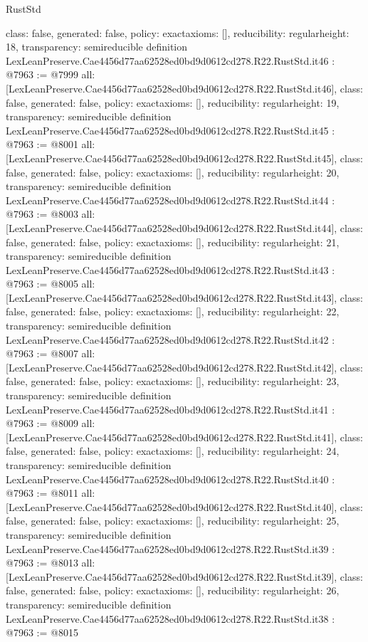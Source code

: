 \begin{lexlean}{RustStd}
\begin{coremodule}
{  class: false,
  generated: false,
  policy: exact{axioms: []},
  reducibility: regular{height: 18},
  transparency: semireducible
}
definition LexLeanPreserve.Cae4456d77aa62528ed0bd9d0612cd278.R22.RustStd.it46 : @7963 := @7999 {
  all: [LexLeanPreserve.Cae4456d77aa62528ed0bd9d0612cd278.R22.RustStd.it46],
  class: false,
  generated: false,
  policy: exact{axioms: []},
  reducibility: regular{height: 19},
  transparency: semireducible
}
definition LexLeanPreserve.Cae4456d77aa62528ed0bd9d0612cd278.R22.RustStd.it45 : @7963 := @8001 {
  all: [LexLeanPreserve.Cae4456d77aa62528ed0bd9d0612cd278.R22.RustStd.it45],
  class: false,
  generated: false,
  policy: exact{axioms: []},
  reducibility: regular{height: 20},
  transparency: semireducible
}
definition LexLeanPreserve.Cae4456d77aa62528ed0bd9d0612cd278.R22.RustStd.it44 : @7963 := @8003 {
  all: [LexLeanPreserve.Cae4456d77aa62528ed0bd9d0612cd278.R22.RustStd.it44],
  class: false,
  generated: false,
  policy: exact{axioms: []},
  reducibility: regular{height: 21},
  transparency: semireducible
}
definition LexLeanPreserve.Cae4456d77aa62528ed0bd9d0612cd278.R22.RustStd.it43 : @7963 := @8005 {
  all: [LexLeanPreserve.Cae4456d77aa62528ed0bd9d0612cd278.R22.RustStd.it43],
  class: false,
  generated: false,
  policy: exact{axioms: []},
  reducibility: regular{height: 22},
  transparency: semireducible
}
definition LexLeanPreserve.Cae4456d77aa62528ed0bd9d0612cd278.R22.RustStd.it42 : @7963 := @8007 {
  all: [LexLeanPreserve.Cae4456d77aa62528ed0bd9d0612cd278.R22.RustStd.it42],
  class: false,
  generated: false,
  policy: exact{axioms: []},
  reducibility: regular{height: 23},
  transparency: semireducible
}
definition LexLeanPreserve.Cae4456d77aa62528ed0bd9d0612cd278.R22.RustStd.it41 : @7963 := @8009 {
  all: [LexLeanPreserve.Cae4456d77aa62528ed0bd9d0612cd278.R22.RustStd.it41],
  class: false,
  generated: false,
  policy: exact{axioms: []},
  reducibility: regular{height: 24},
  transparency: semireducible
}
definition LexLeanPreserve.Cae4456d77aa62528ed0bd9d0612cd278.R22.RustStd.it40 : @7963 := @8011 {
  all: [LexLeanPreserve.Cae4456d77aa62528ed0bd9d0612cd278.R22.RustStd.it40],
  class: false,
  generated: false,
  policy: exact{axioms: []},
  reducibility: regular{height: 25},
  transparency: semireducible
}
definition LexLeanPreserve.Cae4456d77aa62528ed0bd9d0612cd278.R22.RustStd.it39 : @7963 := @8013 {
  all: [LexLeanPreserve.Cae4456d77aa62528ed0bd9d0612cd278.R22.RustStd.it39],
  class: false,
  generated: false,
  policy: exact{axioms: []},
  reducibility: regular{height: 26},
  transparency: semireducible
}
definition LexLeanPreserve.Cae4456d77aa62528ed0bd9d0612cd278.R22.RustStd.it38 : @7963 := @8015 {
}
\end{coremodule}
\end{lexlean}
